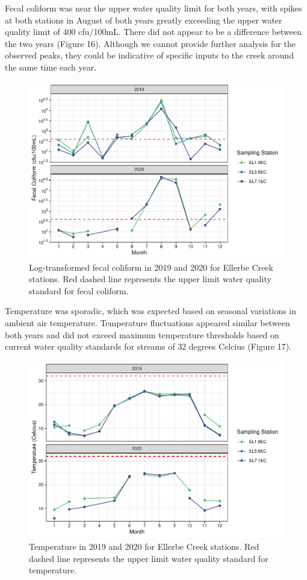 \documentclass[
  12pt,
]{article}
\begin{document}
Fecal coliform was near the upper water quality limit for both years,
with spikes at both stations in August of both years greatly exceeding
the upper water quality limit of 400 cfu/100mL. There did not appear to
be a difference between the two years (Figure 16). Although we cannot
provide further analysis for the observed peaks, they could be
indicative of specific inputs to the creek around the same time each
year.

\begin{figure}
\centering
\includegraphics{August_Lindborg_ENV872_Project_files/figure-latex/unnamed-chunk-17-1.pdf}
\caption{Log-transformed fecal coliform in 2019 and 2020 for Ellerbe
Creek stations. Red dashed line represents the upper limit water quality
standard for fecal coliform.}
\end{figure}

Temperature was sporadic, which was expected based on seasonal
variations in ambient air temperature. Temperature fluctuations appeared
similar between both years and did not exceed maximum temperature
thresholds based on current water quality standards for streams of 32
degrees Celcius (Figure 17).

\begin{figure}
\centering
\includegraphics{August_Lindborg_ENV872_Project_files/figure-latex/unnamed-chunk-18-1.pdf}
\caption{Temperature in 2019 and 2020 for Ellerbe Creek stations. Red
dashed line represents the upper limit water quality standard for
temperature.}
\end{figure}
\end{document}
